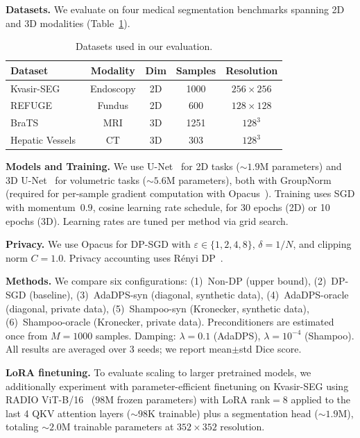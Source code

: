 \documentclass[runningheads]{llncs}
\begin{document}
\textbf{Datasets.}
We evaluate on four medical segmentation benchmarks spanning 2D and 3D modalities (Table~\ref{tab:datasets}).

\begin{table}[t]
\centering
\caption{Datasets used in our evaluation.}\label{tab:datasets}
\renewcommand{\arraystretch}{1.1}
\small
\begin{tabular}{lcccc}
\toprule
\textbf{Dataset} & \textbf{Modality} & \textbf{Dim} & \textbf{Samples} & \textbf{Resolution} \\
\midrule
Kvasir-SEG~\cite{jha2020kvasir} & Endoscopy & 2D & 1000 & $256{\times}256$ \\
REFUGE~\cite{orlando2020refuge} & Fundus & 2D & 600 & $128{\times}128$ \\
BraTS~\cite{brats2024} & MRI & 3D & 1251 & $128^3$ \\
Hepatic Vessels~\cite{antonelli2022medical} & CT & 3D & 303 & $128^3$ \\
\bottomrule
\end{tabular}
\end{table}

\textbf{Models and Training.}
We use U-Net~\cite{ronneberger2015unet} for 2D tasks (${\sim}1.9$M parameters) and 3D U-Net~\cite{cicek20163d} for volumetric tasks (${\sim}5.6$M parameters), both with GroupNorm~\cite{wu2018group} (required for per-sample gradient computation with Opacus~\cite{opacus}). Training uses SGD with momentum~$0.9$, cosine learning rate schedule, for 30 epochs (2D) or 10 epochs (3D). Learning rates are tuned per method via grid search.

\textbf{Privacy.}
We use Opacus for DP-SGD with $\varepsilon\in\{1,2,4,8\}$, $\delta=1/N$, and clipping norm $C{=}1.0$. Privacy accounting uses R\'{e}nyi DP~\cite{Mironov_2017}.

\textbf{Methods.}
We compare six configurations: (1)~Non-DP (upper bound), (2)~DP-SGD (baseline), (3)~AdaDPS-syn (diagonal, synthetic data), (4)~AdaDPS-oracle (diagonal, private data), (5)~Shampoo-syn (Kronecker, synthetic data), (6)~Shampoo-oracle (Kronecker, private data). Preconditioners are estimated once from $M{=}1000$ samples. Damping: $\lambda{=}0.1$ (AdaDPS), $\lambda{=}10^{-4}$ (Shampoo). All results are averaged over 3 seeds; we report mean$\pm$std Dice score.

\textbf{LoRA finetuning.}
To evaluate scaling to larger pretrained models, we additionally experiment with parameter-efficient finetuning on Kvasir-SEG using RADIO ViT-B/16~\cite{ranzinger2024radio} ($98$M frozen parameters) with LoRA rank$=8$ applied to the last 4 QKV attention layers (${\sim}98$K trainable) plus a segmentation head (${\sim}1.9$M), totaling ${\sim}2.0$M trainable parameters at $352{\times}352$ resolution.
\end{document}
